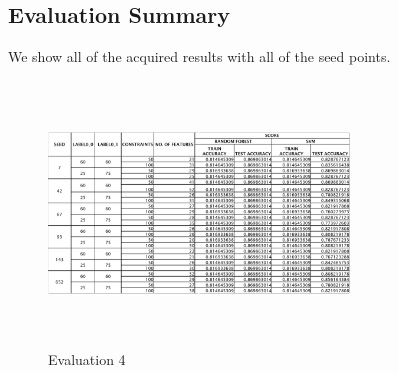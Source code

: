 \documentclass[10pt, conference, compsocconf]{IEEEtran}
\begin{document}
\subsection{Evaluation Summary}
We show all of the acquired results with all of the seed points.
\begin{figure}[H]
\centering
\includegraphics[width=8cm,height=7cm]{eval.PNG}
\caption{\label{fig:2-Evaluation 4} Evaluation 4}
\end{figure}

\end{document}
